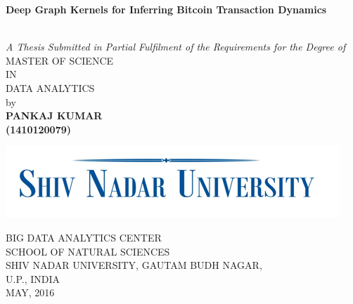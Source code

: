 \documentclass[12pt, oneside]{Thesis} %
\begin{document}
\begin{titlepage}

\begin{center}
\vfill
{ \huge \textbf{Deep Graph Kernels for Inferring Bitcoin Transaction Dynamics}}\\
{ \LARGE \textbf{} }\\ %
			
\end{center}
\begin{center}
\textit{A Thesis Submitted in Partial Fulfilment of the Requirements for the Degree of}\\[1cm]
\textmd{MASTER OF SCIENCE}\\
IN\\
\textmd{DATA ANALYTICS}\\
\singlespacing
\singlespacing
\large{by}\\[0.5cm]
\singlespacing
\singlespacing
\large\textbf{PANKAJ KUMAR}\\
\large\textbf{(1410120079)}\\[2cm]
\singlespacing
\begin{center}
\includegraphics[scale=1]{./snulogo.png}
\end{center}
\singlespacing
\singlespacing
\begin{center}
\textmd{BIG DATA ANALYTICS CENTER}\\
\singlespacing
SCHOOL OF NATURAL SCIENCES\\
\singlespacing
\textmd{SHIV NADAR UNIVERSITY, GAUTAM BUDH NAGAR,}\\
\singlespacing
U.P., INDIA\\
\singlespacing
MAY, 2016\\

\end{center}
\end{center}
\end{titlepage}
\end{document}
